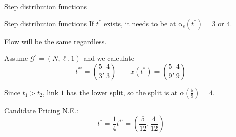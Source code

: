 \documentclass{beamer}
\newcommand{\as}{\mathrm{\alpha_s}}
\newcommand{\Gm}{\mathcal{G}}
\begin{document}
\begin{frame}{Step distribution functions}
\begin{center}
\begin{multicols}{2}
		\end{multicols}
	\end{center}
\end{frame}

\begin{frame}{Step distribution functions}
	If $t^*$ exists, it needs to be at $\as(t^*) = 3$ or $4$.

	Flow will be the same regardless.

	Assume $\Gm^\prime = (N, \ell, 1)$ and we calculate
	\[t^{*\prime} = \left(\frac53, \frac43\right) \qquad x(t^*) = \left(\frac59, \frac49\right)\]

	Since $t_1 > t_2$, link $1$ has the lower split, so the split is at $\alpha\left(\frac59\right) = 4$.

	Candidate Pricing N.E.:
	\[t^* = \frac14 t^{*\prime} = \left(\frac{5}{12}, \frac{4}{12}\right)\]
\end{frame}
\end{document}
